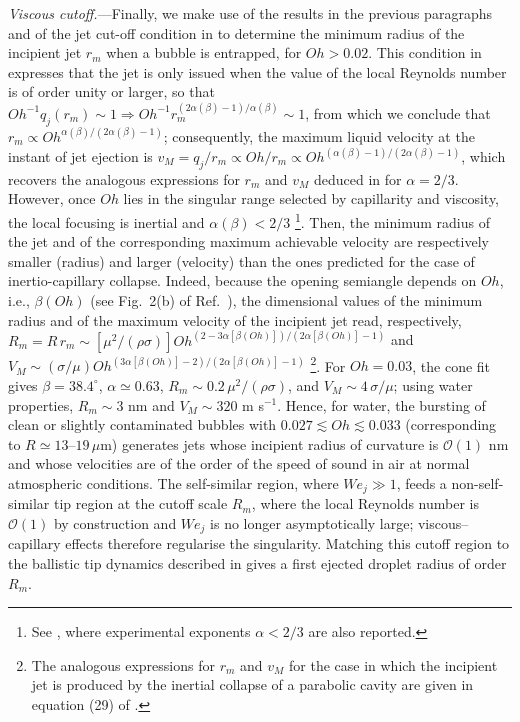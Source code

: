 \documentclass[twocolumn]{revtex4-2}
\begin{document}
\emph{Viscous cutoff.}---Finally, we make use of the results in the previous paragraphs and of the jet cut-off condition in \cite{JFM2019,PRF2023} to determine the minimum radius of the incipient jet $r_m$ when a bubble is entrapped, for $Oh>0.02$. This condition in \cite{JFM2019,PRF2023} expresses that the jet is only issued when the value of the local Reynolds number is of order unity or larger, so that $Oh^{-1}q_j(r_m)\sim 1\Rightarrow Oh^{-1} r_{m}^{(2\alpha(\beta)-1)/\alpha(\beta)}\sim 1$, from which we conclude that $r_m\propto Oh^{\alpha(\beta)/(2\alpha(\beta)-1)}$; consequently, the maximum liquid velocity at the instant of jet ejection is $v_M=q_j/r_m\propto Oh/r_m\propto Oh^{(\alpha(\beta)-1)/(2\alpha(\beta)-1)}$, which recovers the analogous expressions for $r_m$ and $v_M$ deduced in \cite{JFM2019} for $\alpha=2/3$. However, once $Oh$ lies in the singular range selected by capillarity and viscosity, the local focusing is inertial and $\alpha(\beta)<2/3$ \footnote{See \cite{Thoroddsen_18,Thoroddsen_2020,Tian2023}, where experimental exponents $\alpha<2/3$ are also reported.}. Then, the minimum radius of the jet and of the corresponding maximum achievable velocity are respectively smaller (radius) and larger (velocity) than the ones predicted for the case of inertio-capillary collapse.
Indeed, because the opening semiangle depends on $Oh$, i.e., $\beta(Oh)$ (see Fig.~2(b) of Ref.~\cite{PRF2023}), the dimensional values of the minimum radius and of the maximum velocity of the incipient jet read, respectively, $R_m=R\,r_m\sim \left[\mu^2/(\rho\sigma)\right] Oh^{(2-3\alpha[\beta(Oh)])/(2\alpha[\beta(Oh)]-1)}$ and $V_M\sim (\sigma/\mu) Oh^{(3\alpha[\beta(Oh)]-2)/(2\alpha[\beta(Oh)]-1)}$ \footnote{The analogous expressions for $r_m$ and $v_M$ for the case in which the incipient jet is produced by the inertial collapse of a parabolic cavity are given in equation (29) of \cite{PRF2023}.}. For $Oh=0.03$, the cone fit \cite{BurstingBubbleCode} gives $\beta=38.4^\circ$, $\alpha\simeq0.63$, $R_m\sim0.2\,\mu^2/(\rho\sigma)$, and $V_M\sim4\,\sigma/\mu$; using water properties, $R_m\sim3$ nm and $V_M\sim320$ m s$^{-1}$.
Hence, for water, the bursting of clean or slightly contaminated bubbles with $0.027 \lesssim Oh\lesssim 0.033$ (corresponding to $R\simeq13$--$19\,\mu$m) generates jets whose incipient radius of curvature is $\mathcal{O}(1)$ nm
and whose velocities are of the order of the speed of sound in air at normal atmospheric conditions. The self-similar region, where $We_j\gg1$, feeds a non-self-similar tip region at the cutoff scale $R_m$, where the local Reynolds number is $\mathcal{O}(1)$ by construction and $We_j$ is no longer asymptotically large; viscous--capillary effects therefore regularise the singularity. Matching this cutoff region to the ballistic tip dynamics described in \cite{JFM2010,JFM2010b} gives a first ejected droplet radius of order $R_m$.
\end{document}
